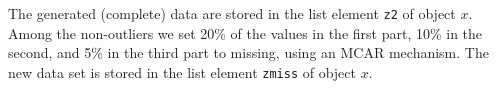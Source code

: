 \documentclass{scrartcl}\usepackage[]{graphicx}\usepackage[]{color}
\makeatletter
\newenvironment{kframe}{%
 \def\at@end@of@kframe{}%
 \ifinner\ifhmode%
  \def\at@end@of@kframe{\end{minipage}}%
  \begin{minipage}{\columnwidth}%
 \fi\fi%
 \def\FrameCommand##1{\hskip\@totalleftmargin \hskip-\fboxsep
 \colorbox{shadecolor}{##1}\hskip-\fboxsep
     \hskip-\linewidth \hskip-\@totalleftmargin \hskip\columnwidth}%
 \MakeFramed {\advance\hsize-\width
   \@totalleftmargin\z@ \linewidth\hsize
   \@setminipage}}%
 {\par\unskip\endMakeFramed%
 \at@end@of@kframe}
\newenvironment{knitrout}{}{} %
\makeatother
\begin{document}
The generated (complete) data are stored in the list element \texttt{z2}
of object $x$. Among the non-outliers we set 20\% of the values in the first
part, 10\% in the second, and 5\% in the third part to missing, using an
MCAR mechanism. The new data set is stored in the list element \texttt{zmiss} of object $x$.




 



\begin{knitrout}
\color{fgcolor}\begin{kframe}


{\ttfamily\noindent{}}\end{kframe}
\end{knitrout}
\end{document}
